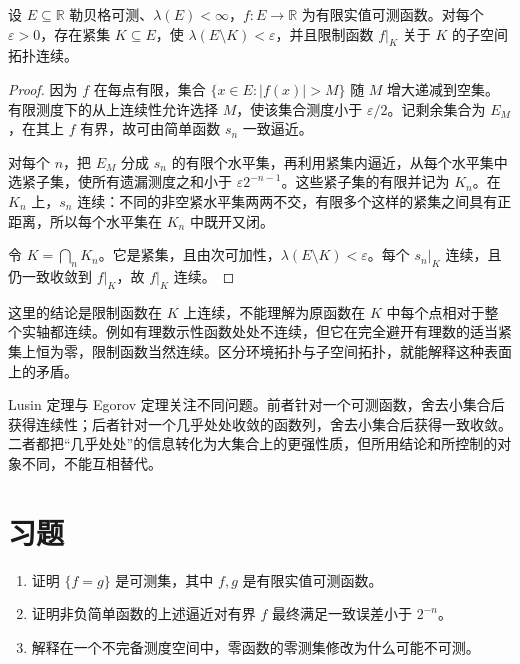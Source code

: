 \begin{theorem}
设 $E\subseteq\mathbb R$ 勒贝格可测、$\lambda(E)<\infty$，$f:E\to\mathbb R$ 为有限实值可测函数。对每个 $\varepsilon>0$，存在紧集 $K\subseteq E$，使 $\lambda(E\setminus K)<\varepsilon$，并且限制函数 $f|_K$ 关于 $K$ 的子空间拓扑连续。
\label{thm:mt-lusin}
\end{theorem}
\begin{proof}
因为 $f$ 在每点有限，集合 $\{x\in E:|f(x)|>M\}$ 随 $M$ 增大递减到空集。有限测度下的从上连续性允许选择 $M$，使该集合测度小于 $\varepsilon/2$。记剩余集合为 $E_M$，在其上 $f$ 有界，故可由简单函数 $s_n$ 一致逼近。

对每个 $n$，把 $E_M$ 分成 $s_n$ 的有限个水平集，再利用紧集内逼近，从每个水平集中选紧子集，使所有遗漏测度之和小于 $\varepsilon2^{-n-1}$。这些紧子集的有限并记为 $K_n$。在 $K_n$ 上，$s_n$ 连续：不同的非空紧水平集两两不交，有限多个这样的紧集之间具有正距离，所以每个水平集在 $K_n$ 中既开又闭。

令 $K=\bigcap_nK_n$。它是紧集，且由次可加性，$\lambda(E\setminus K)<\varepsilon$。每个 $s_n|_K$ 连续，且仍一致收敛到 $f|_K$，故 $f|_K$ 连续。
\end{proof}

这里的结论是限制函数在 $K$ 上连续，不能理解为原函数在 $K$ 中每个点相对于整个实轴都连续。例如有理数示性函数处处不连续，但它在完全避开有理数的适当紧集上恒为零，限制函数当然连续。区分环境拓扑与子空间拓扑，就能解释这种表面上的矛盾。

Lusin 定理与 Egorov 定理关注不同问题。前者针对一个可测函数，舍去小集合后获得连续性；后者针对一个几乎处处收敛的函数列，舍去小集合后获得一致收敛。二者都把“几乎处处”的信息转化为大集合上的更强性质，但所用结论和所控制的对象不同，不能互相替代。

\section{习题}
\begin{enumerate}
 \item 证明 $\{f=g\}$ 是可测集，其中 $f,g$ 是有限实值可测函数。
 \item 证明非负简单函数的上述逼近对有界 $f$ 最终满足一致误差小于 $2^{-n}$。
 \item 解释在一个不完备测度空间中，零函数的零测集修改为什么可能不可测。
\end{enumerate}

